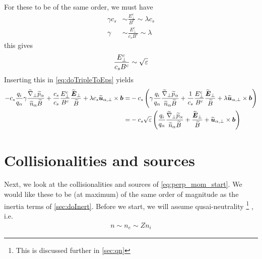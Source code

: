 %
For these to be of the same order, we must have
%
\begin{align*}
    \gamma c_s &\sim \frac{E_\perp^c}{B^c} \sim \lambda c_s \\
    \gamma     &\sim \frac{E_\perp^c}{c_sB^c} \sim \lambda
\end{align*}
%
this gives
%
\begin{align*}
    \frac{E_\perp^c}{c_sB^c} \sim \sqrt{\varepsilon}
\end{align*}
%
Inserting this in \cref{eq:doTripleToEps} yields
%
\begin{align*}
-
c_s
\frac{q_i}{q_\a}
\gamma
\frac{ \wt{\grad}_\perp \wt{p}_\a }{\wt{n}_\a \wt{B}}
+ \frac{c_s}{c_s}\frac{E_\perp^c}{B^c}
\frac{\wt{\ve{E}}_\perp}{\wt{B}}
+\lambda c_s
\wt{\ve{u}}_{\a,\perp}\times\ve{b}
=&
-
c_s
\L(
\gamma
\frac{q_i}{q_\a}
\frac{ \wt{\grad}_\perp \wt{p}_\a }{\wt{n}_\a \wt{B}}
+ \frac{1}{c_s}\frac{E_\perp^c}{B^c}
\frac{\wt{\ve{E}}_\perp}{\wt{B}}
+\lambda
\wt{\ve{u}}_{\a,\perp}\times\ve{b}
\R)
\\
%
%
=&
-
c_s
\sqrt{\e}
\L(
\frac{q_i}{q_\a}
\frac{ \wt{\grad}_\perp \wt{p}_\a }{\wt{n}_\a \wt{B}}
+
\frac{\wt{\ve{E}}_\perp}{\wt{B}}
+
\wt{\ve{u}}_{\a,\perp}\times\ve{b}
\R)
\end{align*}

\section{Collisionalities and sources}
%
Next, we look at the collisionalities and sources of \cref{eq:perp_mom_start}.
We would like these to be (at maximum) of the same order of magnitude as the inertia terms of \cref{sec:doInert}.
Before we start, we will assume qusai-neutrality%
\footnote{This is discussed further in \cref{sec:qn}}%
%
, i.e.
%
\begin{align*}
    n\sim n_e \sim Zn_i
\end{align*}
%


